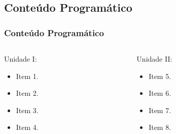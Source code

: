 \subsection[Conteúdo Programático]{Conteúdo Programático}\label{subsec:plano-ensino-conteudo}



\begin{frame}[t]\frametitle{Conteúdo Programático}

  \begin{columns}[onlytextwidth,T]

    \begin{column}{0.45\linewidth}
      \begin{block}{Unidade I:}
        \begin{itemize}
          \justifying{}
          \setlength\itemsep{1em}
          \item Item 1.
          \item Item 2.
          \item Item 3.
          \item Item 4.
        \end{itemize}
      \end{block}
    \end{column}

    \begin{column}{0.45\linewidth}
      \begin{block}{Unidade II:}
        \begin{itemize}
          \justifying{}
          \setlength\itemsep{1em}
          \item Item 5.
          \item Item 6.
          \item Item 7.
          \item Item 8.
        \end{itemize}
      \end{block}
    \end{column}

  \end{columns}

\end{frame}



